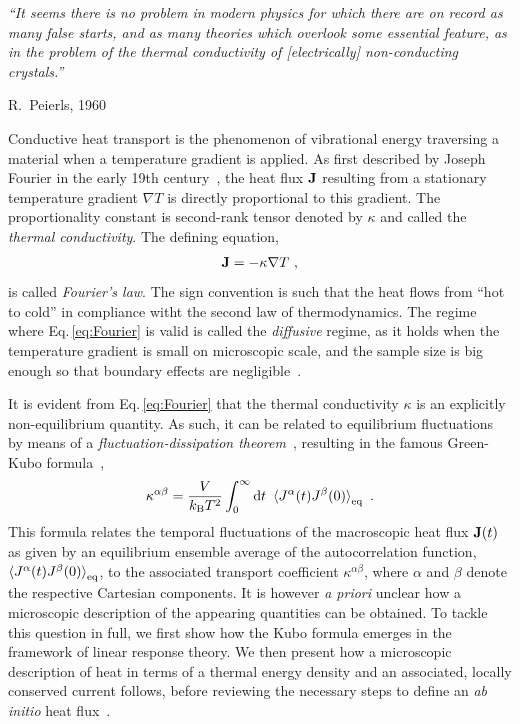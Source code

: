 \label{chp:heat_transport}
\epigraph{\singlespacing \it ``It seems there is no problem in modern physics for which there are on record as many false starts, and as many theories which overlook some essential feature, as in the problem of the thermal conductivity of [electrically] non-conducting crystals.''}{R.~Peierls, 1960~\cite{Peierls1960}}


Conductive heat transport is the phenomenon of vibrational energy traversing a material when a temperature gradient is applied. As first described by Joseph Fourier in the early 19th century~\cite{Fourier1878}, the heat flux ${\bf J}$ resulting from a stationary temperature gradient $\nabla T$ is directly proportional to this gradient. The proportionality constant is second-rank tensor denoted by $\kappa$ and called the \emph{thermal conductivity}. The defining equation,
\begin{align}
  \b J = - \kappa \nabla T~,
  \label{eq:Fourier}
\end{align}
is called \emph{Fourier's law}. The sign convention is such that the heat flows from ``hot to cold'' in compliance witht the second law of thermodynamics. The regime where Eq.\,\eqref{eq:Fourier} is valid is called the \emph{diffusive} regime, as it holds when the temperature gradient is small on microscopic scale, and the sample size is big enough so that boundary effects are negligible~\cite{Kapitza1941a,Antidormi2020}.

It is evident from Eq.\,\eqref{eq:Fourier} that the thermal conductivity $\kappa$ is an explicitly non-equilibrium quantity. As such, it can be related to equilibrium fluctuations by means of a \emph{fluctuation-dissipation theorem}~\cite{Einstein1905a,Nyquist1928,Callen1951,Kubo1957a}, resulting in the famous Green-Kubo formula~\cite{Green1952,Kubo1957b},
\begin{align}
  \kappa^{\alpha \beta} = \frac{V}{k_{\rm B} T^2} \int_{0}^{\infty} \d t ~
    \braket{J^\alpha (t) J^\beta(0)}_{\rm eq}~.
  \label{eq:GreenKubo}
\end{align}
This formula relates the temporal fluctuations of the macroscopic heat flux ${\bf J} (t)$ as given by an equilibrium ensemble average of the autocorrelation function, $\braket{J^\alpha (t) J^\beta(0)}_{\rm eq}$, to the associated transport coefficient $\kappa^{\alpha \beta}$, where $\alpha$ and $\beta$ denote the respective Cartesian components. It is however \emph{a priori} unclear how a microscopic description of the appearing quantities can be obtained. To tackle this question in full, we first show how the Kubo formula emerges in the framework of linear response theory. We then present how a microscopic description of heat in terms of a thermal energy density and an associated, locally conserved current follows, before reviewing the necessary steps to define an \emph{ab initio} heat flux~\cite{Carbogno2016}.

